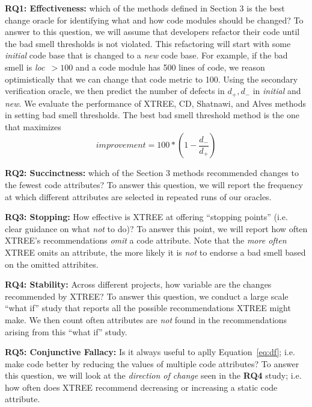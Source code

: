 \documentclass[twocolumn,5p]{elsarticle}
\newcommand{\eq}[1]{Equation~\ref{eq:#1}}
\theoremstyle{break}
\begin{document}
\begin{itemize}
{\bf RQ1: Effectiveness: } which of the methods defined in Section 3 is the best change oracle for identifying what and how code modules should be changed? 
To   answer to this question, we will assume that developers
refactor their code until the bad smell thresholds is not violated.
This refactoring will start with some {\em initial} code
base that is changed to a {\em new} code base. 
For example, if the bad smell is \mbox{{\em loc $>100$}} and a 
code module has 500 lines of code, we reason
optimistically that we can change that code metric
to 100.  
Using the secondary verification oracle,  we then predict the
number of defects in $d_+,d_-$ in {\em initial} and {\em new}. We evaluate the performance of XTREE, CD, Shatnawi, and Alves methods in setting bad smell thresholds.
The best bad smell threshold method is the one that maximizes
\begin{equation}\label{eq:diff}
\mathit{improvement} = 100* \left(1 - \frac{ d_- }{ d_+}\right)
\end{equation}


{\bf RQ2: Succinctness: } which of the Section 3 methods recommended changes to the fewest code attributes?
To answer this question, we will report the frequency at which different attributes are selected in repeated runs of our oracles.

{\bf RQ3: Stopping: }    How effective is XTREE at offering   ``stopping points'' (i.e. clear guidance on what {\em not} to do)?   
To answer this point, we will report how often XTREE's recommendations {\em omit} a code attribute. 
Note that the {\em more often} XTREE omits an attribute, the more likely it is {\em not} to endorse a bad smell based on the omitted
attribites.

{\bf RQ4: Stability:} Across different projects, how variable are the changes recommended by XTREE?   To answer this
question, we conduct a large scale ``what if'' study that reports all the possible recommendations XTREE might make.
We then count often attributes are {\em not} found in the recommendations arising from this ``what if'' study.

{\bf RQ5: Conjunctive Fallacy:} Is  it  always  useful  to  aplly \eq{df}; i.e.   make  code  better  by  reducing  the  values  of multiple code attributes? To answer this question, we will look at the {\em direction of change} seen in the {\bf RQ4} study; i.e.
how often does XTREE recommend decreasing or increasing a static code attribute.


 
  


\end{itemize}
\end{document}
